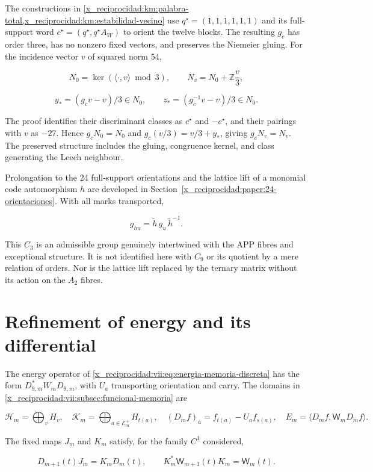 The constructions in \cref{x_reciprocidad:km:palabra-total,x_reciprocidad:km:estabilidad-vecino} use \(q^\star=(1,1,1,1,1,1)\) and its full-support word \(c^\star=(q^\star,q^\star A_W)\) to orient the twelve blocks. The resulting \(g_c\) has order three, has no nonzero fixed vectors, and preserves the Niemeier gluing. For the incidence vector \(v\) of squared norm \(54\),

\[
N_0=\ker(\langle\cdot,v\rangle\bmod3),\qquad
N_v=N_0+\mathbb Z\frac v3,
\]

\[
y_*=(g_cv-v)/3\in N_0,\qquad
z_*=(g_c^{-1}v-v)/3\in N_0.
\]

The proof identifies their discriminant classes as \(c^\star\) and \(-c^\star\), and their pairings with \(v\) as \(-27\). Hence \(g_cN_0=N_0\) and \(g_c(v/3)=v/3+y_*\), giving \(g_cN_v=N_v\). The preserved structure includes the gluing, congruence kernel, and class generating the Leech neighbour.

Prolongation to the 24 full-support orientations and the lattice lift of a monomial code automorphism \(h\) are developed in Section~\ref{x_reciprocidad:paper:24-orientaciones}. With all marks transported,

\[
g_{hu}=\widetilde h\,g_u\,\widetilde h^{-1}.
\]

This \(C_3\) is an admissible group genuinely intertwined with the APP fibres and exceptional structure. It is not identified here with \(C_9\) or its quotient by a mere relation of orders. Nor is the lattice lift replaced by the ternary matrix without its action on the \(A_2\) fibres.

\section{Refinement of energy and its differential}
\label{x_reciprocidad:paper:refinamiento-energia}

The energy operator of \eqref{x_reciprocidad:vii:eq:energia-memoria-discreta} has the form \(D_{9,m}^*W_mD_{9,m}\), with \(U_a\) transporting orientation and carry. The domains in \cref{x_reciprocidad:vii:subsec:funcional-memoria} are

\[
\mathcal H_m=\bigoplus_vH_v,\quad
\mathcal K_m=\bigoplus_{a\in\mathcal E_m^+}H_{t(a)},\quad
(D_mf)_a=f_{t(a)}-U_af_{s(a)},\quad
E_m=\langle D_mf,\mathsf W_mD_mf\rangle.
\]

The fixed maps \(J_m\) and \(K_m\) satisfy, for the family \(C^1\) considered,

\[
D_{m+1}(t)J_m=K_mD_m(t),\qquad
K_m^*\mathsf W_{m+1}(t)K_m=\mathsf W_m(t).
\]

